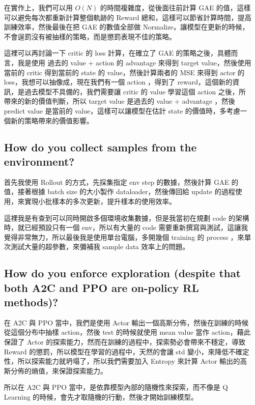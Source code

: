 在實作上，我們可以用 $O(N)$ 的時間複雜度，從後面往前計算 GAE 的值，這樣可以避免每次都重新計算整個軌跡的 Reward 總和，這樣可以節省計算時間，提高訓練效率，然後最後在把 GAE 的數值全部做 Normalize，讓模型在更新的時候，不會逞罰沒有被抽樣的策略，而是懲罰表現不佳的策略。

這裡可以再討論一下 critic 的 loss 計算，在確立了 GAE 的策略之後，具體而言，我是使用 過去的 value + action 的 advantage 來得到 target value，然後使用當前的 critic 得到當前的 state 的 value，然後計算兩者的 MSE 來得到 actor 的 loss，我想可以抽像成，現在我們有一個 action ，得到了 reward，這個新的資訊，是過去模型不具備的，我們需要讓 critic 的 value 學習這個 action 之後，所帶來的新的價值判斷，所以 target value 是過去的 value + advantage ，然後 predict value 是當前的 value，這樣可以讓模型在估計 state 的價值時，多考慮一個新的策略帶來的價值影響。



\subsection{How do you collect samples from the environment?}

首先我使用 Rollout 的方式，先採集指定 env step 的數據，然後計算 GAE 的值，接著根據 batch size 的大小製作 dataloader，然後傳回給 update 的過程使用，來實現小批樣本的多次更新，提升樣本的使用效率。

這裡我是有查到可以同時開啟多個環境收集數據，但是我當初在規劃 code 的架構時，就已經預設只有一個 env，所以有大量的 code 需要重新撰寫與測試，這讓我覺得非常無力，所以最後我是使用單台電腦，多開幾個 training 的 process ，來單次測試大量的超參數，來彌補我 sample data 效率上的問題。

\clearpage
\subsection{How do you enforce exploration (despite that both A2C and PPO are on-policy RL methods)?}

在 A2C 與 PPO 當中，我們是使用 Actor 輸出一個高斯分佈，然後在訓練的時候從這個分布中抽樣 action，然後 test 的時候就使用 mean value 當作 action，藉此保證了 Actor 的探索能力，然而在訓練的過程中，探索勢必會帶來不穩定，導致 Reward 的懲罰，所以模型在學習的過程中，天然的會讓 std 變小，來降低不確定性，所以探索能力就坍塌了，所以我們需要加入 Entropy 來計算 Actor 輸出的高斯分佈的熵值，來保證探索能力。

所以在 A2C 與 PPO 當中，是依靠模型內部的隨機性來探索，而不像是 Q Learning 的時候，會先才取隨機的行動，然後才開始訓練模型。

